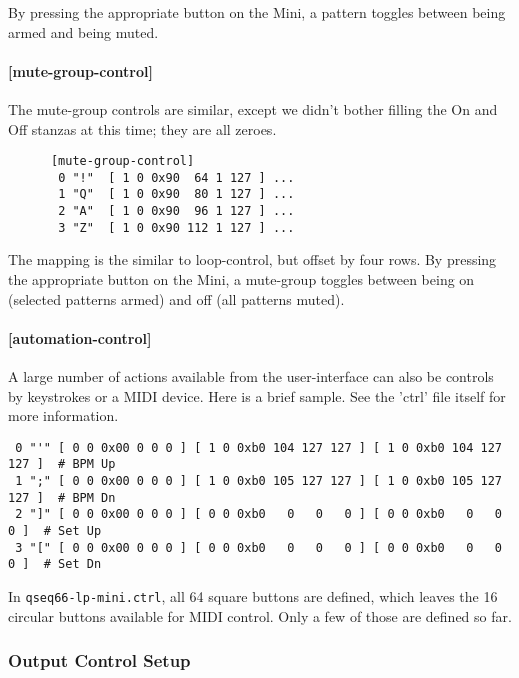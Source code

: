    By pressing the appropriate button on the Mini, a pattern toggles between being
   armed and being muted.

\paragraph{[mute-group-control]}
\label{paragraph:patterns_mute_group_control}

   The mute-group controls are similar, except we didn't bother filling the On
   and Off stanzas at this time; they are all zeroes.

   \begin{verbatim}
      [mute-group-control]
       0 "!"  [ 1 0 0x90  64 1 127 ] ...
       1 "Q"  [ 1 0 0x90  80 1 127 ] ...
       2 "A"  [ 1 0 0x90  96 1 127 ] ...
       3 "Z"  [ 1 0 0x90 112 1 127 ] ...
   \end{verbatim}

   The mapping is the similar to loop-control, but offset by four rows.
   By pressing the appropriate button on the Mini, a mute-group toggles between
   being on (selected patterns armed) and off (all patterns muted).

\paragraph{[automation-control]}
\label{paragraph:patterns_automation_control}

   A large number of actions available from the user-interface can also be
   controls by keystrokes or a MIDI device.  Here is a brief sample.  See the
   'ctrl' file itself for more information.

\begin{verbatim}
 0 "'" [ 0 0 0x00 0 0 0 ] [ 1 0 0xb0 104 127 127 ] [ 1 0 0xb0 104 127 127 ]  # BPM Up
 1 ";" [ 0 0 0x00 0 0 0 ] [ 1 0 0xb0 105 127 127 ] [ 1 0 0xb0 105 127 127 ]  # BPM Dn
 2 "]" [ 0 0 0x00 0 0 0 ] [ 0 0 0xb0   0   0   0 ] [ 0 0 0xb0   0   0   0 ]  # Set Up
 3 "[" [ 0 0 0x00 0 0 0 ] [ 0 0 0xb0   0   0   0 ] [ 0 0 0xb0   0   0   0 ]  # Set Dn
\end{verbatim}

   In \texttt{qseq66-lp-mini.ctrl}, all 64 square buttons are defined, which
   leaves the 16 circular buttons available for MIDI control. Only a few of those
   are defined so far.

\subsubsection{Output Control Setup}
\label{subsubsec:launchpad_mini_output_control_setup}


